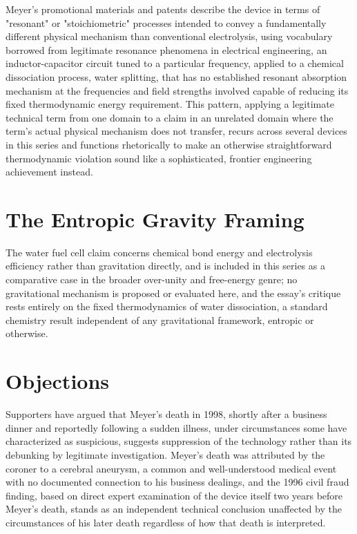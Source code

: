 \documentclass[11pt]{article}
\begin{document}
Meyer's promotional materials and patents describe the device in terms of "resonant" or "stoichiometric" processes intended to convey a fundamentally different physical mechanism than conventional electrolysis, using vocabulary borrowed from legitimate resonance phenomena in electrical engineering, an inductor-capacitor circuit tuned to a particular frequency, applied to a chemical dissociation process, water splitting, that has no established resonant absorption mechanism at the frequencies and field strengths involved capable of reducing its fixed thermodynamic energy requirement. This pattern, applying a legitimate technical term from one domain to a claim in an unrelated domain where the term's actual physical mechanism does not transfer, recurs across several devices in this series and functions rhetorically to make an otherwise straightforward thermodynamic violation sound like a sophisticated, frontier engineering achievement instead.

\section{The Entropic Gravity Framing}

The water fuel cell claim concerns chemical bond energy and electrolysis efficiency rather than gravitation directly, and is included in this series as a comparative case in the broader over-unity and free-energy genre; no gravitational mechanism is proposed or evaluated here, and the essay's critique rests entirely on the fixed thermodynamics of water dissociation, a standard chemistry result independent of any gravitational framework, entropic or otherwise.

\section{Objections}

Supporters have argued that Meyer's death in 1998, shortly after a business dinner and reportedly following a sudden illness, under circumstances some have characterized as suspicious, suggests suppression of the technology rather than its debunking by legitimate investigation. Meyer's death was attributed by the coroner to a cerebral aneurysm, a common and well-understood medical event with no documented connection to his business dealings, and the 1996 civil fraud finding, based on direct expert examination of the device itself two years before Meyer's death, stands as an independent technical conclusion unaffected by the circumstances of his later death regardless of how that death is interpreted.
\end{document}
